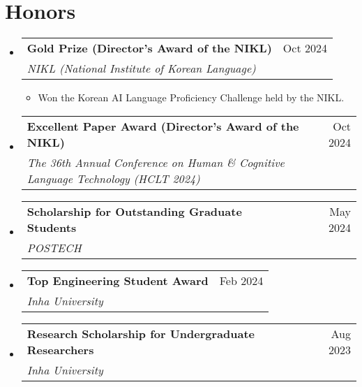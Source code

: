 \documentclass[letterpaper,11pt]{article}
\makeatletter
\newcommand{\resumeSubheading}[4]{
  \vspace{-1pt}\item
    \begin{tabular*}{0.97\textwidth}{l@{\extracolsep{\fill}}r}
      #1 & #2 \\
      \textit{\small#3} & \textit{\small #4} \\
    \end{tabular*}\vspace{-5pt}
}
\makeatother
\begin{document}
    \section{Honors}
    \begin{itemize}[leftmargin=*,label=]

        \resumeSubheading
        {\textbf{Gold Prize (Director's Award of the NIKL)}}{Oct 2024}
            {NIKL (National Institute of Korean Language)}{}
            \begin{itemize}[label=\bullet]
                \item{Won the Korean AI Language Proficiency Challenge held by the NIKL.}
            \end{itemize}
            
        \resumeSubheading
        {\textbf{Excellent Paper Award (Director's Award of the NIKL)}}{Oct 2024}
            {The 36th Annual Conference on Human \& Cognitive Language Technology (HCLT 2024)}{}
            

            
        \resumeSubheading
        {\textbf{Scholarship for Outstanding Graduate Students}}{May 2024}
            {POSTECH}{}
            
        \resumeSubheading
        {\textbf{Top Engineering Student Award}}{Feb 2024}
            {Inha University}{}

        \resumeSubheading
        {\textbf{Research Scholarship for Undergraduate Researchers}}{Aug 2023}
            {Inha University}{}
            
    \end{itemize}
\end{document}
